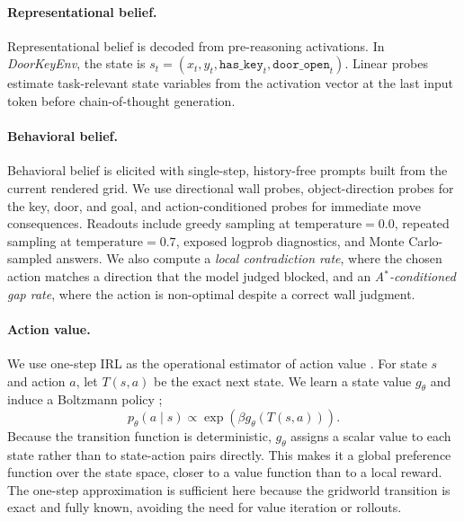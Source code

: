 \documentclass[10pt,twocolumn]{article}
\begin{document}
\paragraph{Representational belief.}
Representational belief is decoded from pre-reasoning activations. In \textit{DoorKeyEnv}, the state is $s_t=(x_t,y_t,\texttt{has\_key}_t,\texttt{door\_open}_t)$. Linear probes estimate task-relevant state variables from the activation vector at the last input token before chain-of-thought generation.

\paragraph{Behavioral belief.}
Behavioral belief is elicited with single-step, history-free prompts built from the current rendered grid. We use directional wall probes, object-direction probes for the key, door, and goal, and action-conditioned probes for immediate move consequences. Readouts include greedy sampling at $\text{temperature}=0.0$, repeated sampling at $\text{temperature}=0.7$, exposed logprob diagnostics, and Monte Carlo-sampled answers. We also compute a \emph{local contradiction rate}, where the chosen action matches a direction that the model judged blocked, and an \emph{A$^*$-conditioned gap rate}, where the action is non-optimal despite a correct wall judgment.

\paragraph{Action value.}
We use one-step IRL as the operational estimator of action value \cite{ng2000algorithms, ziebartMaximumEntropyInverse2008a}. For state $s$ and action $a$, let $T(s,a)$ be the exact next state. We learn a state value $g_\theta$ and induce a Boltzmann policy \cite{ziebartMaximumEntropyInverse2008a, skalse_misspecification_2023};
\[
p_\theta(a \mid s) \propto \exp\!\left(\beta g_\theta(T(s,a))\right).
\]
Because the transition function is deterministic, $g_\theta$ assigns a scalar value to each state rather than to state-action pairs directly. This makes it a global preference function over the state space, closer to a value function than to a local reward. The one-step approximation is sufficient here because the gridworld transition is exact and fully known, avoiding the need for value iteration or rollouts.
\end{document}
